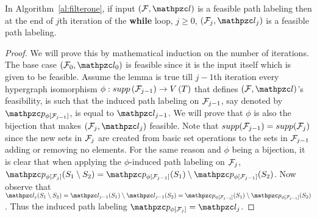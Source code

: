 \begin{lemma}
  \label{lem:feasible}
  In Algorithm~\ref{al:filterone}, if input $(\cF, \cl)$ is a feasible path
  labeling then at the end of $j$th iteration of the {\bf while}
  loop, $j \ge 0$, $(\cF_j, \cl_j)$ is a feasible path labeling.
\end{lemma}
\begin{proof}\thesisspacing
  We will prove this by mathematical induction on the number of
  iterations. The base case $(\cF_0, \cl_0)$ is feasible since it is
  the input itself which is given to be feasible. Assume the lemma is
  true till $j-1$th iteration \ie every hypergraph isomorphism $\phi:
  supp\left({\cal F}_{j-1}\right) \rightarrow V\left(T \right)$ that
  defines $(\cF, \cl)$'s feasibility, is such that the induced path
  labeling on ${\cal F}_{j-1}$, say denoted by $\cp_{\phi[{\cF_{j-1}}]}$,
  is equal to $\cl_{j-1}$.
  We will prove that $\phi$ is also the bijection that makes $(\cF_j,
  \cl_j)$ feasible. Note that $supp({\cal F}_{j-1}) = supp({\cal F}_{j})$ since
  the new sets in ${\cal F}_j$ are created from basic set operations to the
  sets in ${\cal F}_{j-1}$ adding or removing no elements. For the same
  reason and $\phi$ being a bijection, it is clear that when applying
  the $\phi$-induced path labeling on ${\cal F}_j$, $
  \cp_{\phi[{\cF_{j}}]}(S_1 \setminus S_2) =
  \cp_{\phi[{\cF_{j-1}}]}(S_1) \setminus
  \cp_{\phi[{\cF_{j-1}}]}(S_2)$. Now observe that $ \cl_j(S_1
  \setminus S_2) = \cl_{j-1}(S_1) \setminus \cl_{j-1}(S_2) =
  \cp_{\phi[{\cF_{j-1}}]}(S_1) \setminus
  \cp_{\phi[{\cF_{j-1}}]}(S_2)$. Thus the induced path labeling
  $\cp_{\phi[{\cF_{j}}]} = \cl_{j}$.  %
\end{proof}


